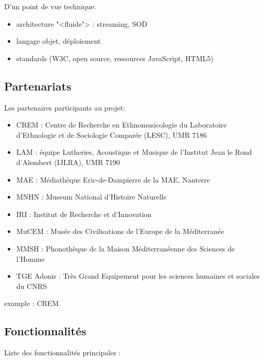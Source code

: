 \documentclass[a4paper,11pt,french]{article}
\begin{document}
D'un point de vue technique:

\begin{itemize}
 \item architecture "<fluide"> : streaming, SOD
 \item langage objet, déploiement
 \item standards (W3C, open source, ressources JavaScript, HTML5)
\end{itemize}

\subsection{Partenariats}

Les partenaires participants au projet:

\begin{itemize}
 \item CREM : Centre de Recherche en Ethnomusicologie du Laboratoire d'Ethnologie et de Sociologie Comparée (LESC), UMR 7186
 \item LAM : équipe Lutheries, Acoustique et Musique de l'Institut Jean le Rond d'Alembert (IJLRA), UMR 7190
 \item MAE : Médiathèque Eric-de-Dampierre de la MAE, Nanterre
 \item MNHN : Museum National d'Histoire Naturelle
 \item IRI : Institut de Recherche et d'Innovation
 \item MuCEM : Musée des Civilisations de l'Europe de la Méditerranée
 \item MMSH : Phonothèque de la Maison Méditerranéenne des Sciences de l'Homme
 \item TGE Adonis : Très Grand Equipement pour les sciences humaines et sociales du CNRS
\end{itemize}


example : CREM

\subsection{Fonctionnalités}

Liste des fonctionnalités principales :
\end{document}

